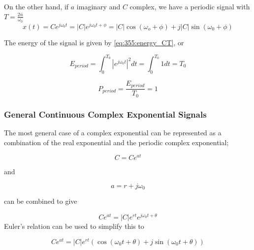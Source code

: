 \documentclass[../notes.tex]{subfiles}
\begin{document}
On the other hand, if $ a $ imaginary and  $ C $ complex, we have a periodic signal with $ T = \frac{2 \overline{n}}{\omega_0} $ 
\begin{equation}
	x(t) = Ce^{j\omega_0 t} = |C|e^{j\omega_0t + \phi} =  |C| \cos(\omega_o + \phi) + j|C| \sin(\omega_0 + \phi)
\end{equation}


The energy of the signal is given by \eqref{eq:355:energy_CT}, or



\begin{equation}
	E_{period} = \int^{T_0}_0 |e^{j\omega_0 t}|^2 dt = \int^{T_0}_0 1 dt = T_0
\end{equation}


\begin{equation}
	P_{period} = \frac{E_{period}}{T_0} = 1
\end{equation}



\subsubsection{General Continuous Complex Exponential Signals}


The most general case of a complex exponential can be represented as a combination of the real exponential and the periodic complex exponential;

\begin{equation}
		C = Ce^{at}
\end{equation}

and

\begin{equation}
	a = r + j\omega_0
\end{equation}

can be combined to give

\begin{definition}
	\begin{equation}
		Ce^{at} = |C|e^{rt}e^{j\omega_0t + \theta}
	\end{equation}
	Euler's relation can be used to simplify this to


	\begin{equation}
		Ce^{at} = |C|e^{rt} \left( \cos(\omega_0t + \theta) + j \sin(\omega_0t + \theta) \right)
	\end{equation}
\end{definition}
\end{document}

